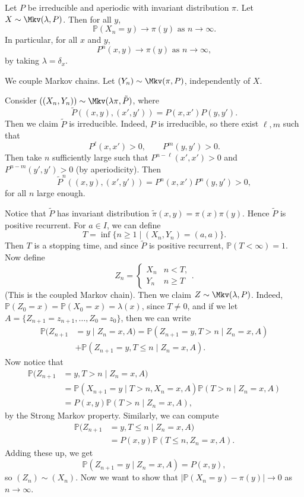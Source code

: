 \documentclass[12pt]{article}
\begin{document}
\begin{theorem}
	Let $P$ be irreducible and aperiodic with invariant distribution $\pi$. Let $X \sim \Mkv(\lambda, P)$. Then for all $y$,
	\[
		\mathbb{P}(X_n = y) \to \pi(y) \text{ as } n \to \infty
	.\]
	In particular, for all $x$ and $y$,
	\[
		P^{n}(x, y) \to \pi(y) \text{ as } n \to \infty
	,\]
	by taking $\lambda = \delta_x$.
\end{theorem}

\begin{proofbox}
	We couple Markov chains. Let $(Y_n) \sim \Mkv(\pi, P)$, independently of $X$.

	Consider $((X_n, Y_n)) \sim \Mkv(\lambda \pi, \tilde P)$, where
	\[
		\tilde P((x, y), (x', y')) = P(x, x') P(y, y')
	.\]
	Then we claim $\tilde P$ is irreducible. Indeed, $P$ is irreducible, so there exist $\ell, m$ such that
	\[
		P^{\ell}(x, x') >0, \qquad P^{m}(y, y') > 0
	.\]
	Then take $n$ sufficiently large such that $P^{n - \ell}(x', x') > 0$ and $P^{n - m}(y', y') > 0$ (by aperiodicity). Then
	\[
		\tilde P^{n}((x, y), (x', y')) = P^{n}(x, x') P^{n}(y, y') > 0
	,\]
	for all $n$ large enough.

	Notice that $\tilde P$ has invariant distribution $\tilde \pi(x, y) = \pi(x) \pi(y)$. Hence $\tilde P$ is positive recurrent. For $a \in I$, we can define
	\[
		T = \inf\{n \geq 1 \mid (X_n, Y_n) = (a, a)\}
	.\]
	Then $T$ is a stopping time, and since $\tilde P$ is positive recurrent, $\mathbb{P}(T < \infty) = 1$. Now define
	\[
	Z_n =
	\begin{cases}
		X_n & n < T, \\
		Y_n & n \geq T
	\end{cases}
	.\]
	(This is the coupled Markov chain). Then we claim $Z \sim \Mkv(\lambda, P)$. Indeed, $\mathbb{P}(Z_0 = x) = \mathbb{P}(X_0 = x) = \lambda(x)$, since $T \neq 0$, and if we let $A = \{Z_{n+1} = z_{n+1}, \ldots, Z_0 = z_0\}$, then we can write
	\begin{align*}
		\mathbb{P}(Z_{n+1} &= y \mid Z_n = x, A) = \mathbb{P}(Z_{n+1} = y, T > n \mid Z_n = x, A) \\
				   &+ \mathbb{P}(Z_{n+1} = y, T \leq n \mid Z_n = x, A).
	\end{align*}
	Now notice that
	\begin{align*}
		\mathbb{P}(Z_{n+1} &= y, T > n \mid Z_n = x, A) \\
				   &= \mathbb{P}(X_{n+1} = y \mid T > n, X_n = x, A) \mathbb{P}(T > n \mid Z_n = x, A) \\
				   &= P(x, y) \mathbb{P}(T > n \mid Z_n = x, A),
	\end{align*}
	by the Strong Markov property. Similarly, we can compute
	\begin{align*}
		\mathbb{P}(Z_{n+1} &= y , T \leq n \mid Z_n = x, A) \\
				   &= P(x, y) \mathbb{P}(T \leq n, Z_n = x, A).
	\end{align*}
	Adding these up, we get
	\[
		\mathbb{P}(Z_{n+1} = y \mid Z_n = x, A) = P(x, y)
	,\]
	so $(Z_n) \sim (X_n)$. Now we want to show that $|\mathbb{P}(X_n = y) - \pi(y)| \to 0$ as $n \to \infty$.


\end{proofbox}
\end{document}
